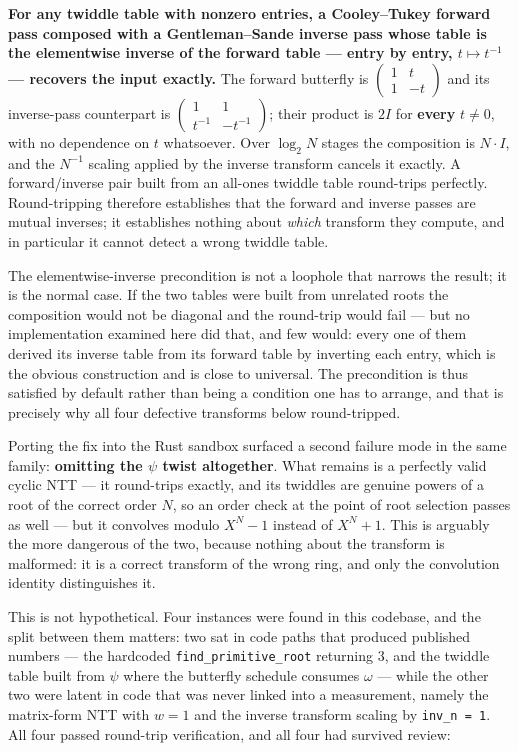 \textbf{For any twiddle table with nonzero entries, a Cooley--Tukey forward pass composed with a Gentleman--Sande inverse pass whose table is the elementwise inverse of the forward table --- entry by entry, \(t \mapsto t^{-1}\) --- recovers the input exactly.} The forward butterfly is \(\begin{pmatrix} 1 & t \\ 1 & -t \end{pmatrix}\) and its inverse-pass counterpart is \(\begin{pmatrix} 1 & 1 \\ t^{-1} & -t^{-1} \end{pmatrix}\); their product is \(2 I\) for \textbf{every} \(t \neq 0\), with no dependence on \(t\) whatsoever. Over \(\log_2 N\) stages the composition is \(N \cdot I\), and the \(N^{-1}\) scaling applied by the inverse transform cancels it exactly. A forward/inverse pair built from an all-ones twiddle table round-trips perfectly. Round-tripping therefore establishes that the forward and inverse passes are mutual inverses; it establishes nothing about \emph{which} transform they compute, and in particular it cannot detect a wrong twiddle table.

The elementwise-inverse precondition is not a loophole that narrows the result; it is the normal case. If the two tables were built from unrelated roots the composition would not be diagonal and the round-trip would fail --- but no implementation examined here did that, and few would: every one of them derived its inverse table from its forward table by inverting each entry, which is the obvious construction and is close to universal. The precondition is thus satisfied by default rather than being a condition one has to arrange, and that is precisely why all four defective transforms below round-tripped.

Porting the fix into the Rust sandbox surfaced a second failure mode in the same family: \textbf{omitting the \(\psi\) twist altogether}. What remains is a perfectly valid cyclic NTT --- it round-trips exactly, and its twiddles are genuine powers of a root of the correct order \(N\), so an order check at the point of root selection passes as well --- but it convolves modulo \(X^N - 1\) instead of \(X^N + 1\). This is arguably the more dangerous of the two, because nothing about the transform is malformed: it is a correct transform of the wrong ring, and only the convolution identity distinguishes it.

This is not hypothetical. Four instances were found in this codebase, and the split between them matters: two sat in code paths that produced published numbers --- the hardcoded \texttt{find\_primitive\_root} returning 3, and the twiddle table built from \(\psi\) where the butterfly schedule consumes \(\omega\) --- while the other two were latent in code that was never linked into a measurement, namely the matrix-form NTT with \(w = 1\) and the inverse transform scaling by \texttt{inv\_n\ =\ 1}. All four passed round-trip verification, and all four had survived review:

